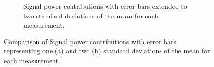 \documentclass[%
  reprint,
  superscriptaddress,
  amsmath,amssymb,
  aps,
  prapplied,
]{revtex4-2}
\begin{document}
\begin{figure}[h]
\begin{subfigure}{0.45\textwidth}
    \caption{Signal power contributions with error bars extended to two standard deviations of the mean for each measurement.}
    \label{fig:PSPr-Contribute-Equally-2sigma}
  \end{subfigure}
  \caption{Comparison of Signal power contributions with error bars representing one (a) and two (b) standard deviations of the mean for each measurement.}
  \label{fig:combined}
\end{figure}


\twocolumngrid

\end{document}
